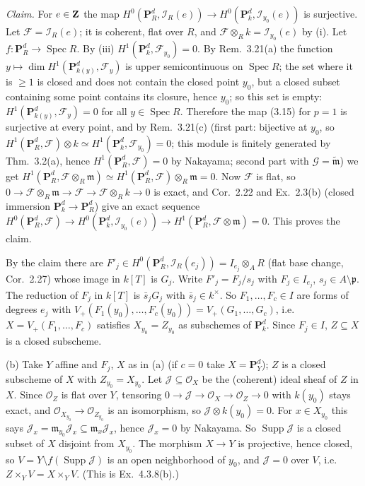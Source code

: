 \documentclass[11pt]{article}
\begin{document}
\emph{Claim.} For $e\in\mathbf Z$ the map $H^0(\mathbf P^d_R,\mathcal I_R(e))\to H^0(\mathbf P^d_k,\mathcal I_{y_0}(e))$ is surjective.
Let $\mathcal F=\mathcal I_R(e)$; it is coherent, flat over $R$, and $\mathcal F\otimes_Rk=\mathcal I_{y_0}(e)$ by (i). Let $f:\mathbf P^d_R\to\operatorname{Spec}R$. By (iii) $H^1(\mathbf P^d_k,\mathcal F_{y_0})=0$. By Rem.~3.21(a) the function $y\mapsto\dim H^1(\mathbf P^d_{k(y)},\mathcal F_y)$ is upper semicontinuous on $\operatorname{Spec}R$; the set where it is $\ge1$ is closed and does not contain the closed point $y_0$, but a closed subset containing some point contains its closure, hence $y_0$; so this set is empty: $H^1(\mathbf P^d_{k(y)},\mathcal F_y)=0$ for all $y\in\operatorname{Spec}R$. Therefore the map (3.15) for $p=1$ is surjective at every point, and by Rem.~3.21(c) (first part: bijective at $y_0$, so $H^1(\mathbf P^d_R,\mathcal F)\otimes k\simeq H^1(\mathbf P^d_k,\mathcal F_{y_0})=0$; this module is finitely generated by Thm.~3.2(a), hence $H^1(\mathbf P^d_R,\mathcal F)=0$ by Nakayama; second part with $\mathcal G=\widetilde{\mathfrak m}$) we get $H^1(\mathbf P^d_R,\mathcal F\otimes_R\mathfrak m)\simeq H^1(\mathbf P^d_R,\mathcal F)\otimes_R\mathfrak m=0$. Now $\mathcal F$ is flat, so $0\to\mathcal F\otimes_R\mathfrak m\to\mathcal F\to\mathcal F\otimes_Rk\to0$ is exact, and Cor.~2.22 and Ex.~2.3(b) (closed immersion $\mathbf P^d_k\to\mathbf P^d_R$) give an exact sequence $H^0(\mathbf P^d_R,\mathcal F)\to H^0(\mathbf P^d_k,\mathcal I_{y_0}(e))\to H^1(\mathbf P^d_R,\mathcal F\otimes\mathfrak m)=0$. This proves the claim.

By the claim there are $F'_j\in H^0(\mathbf P^d_R,\mathcal I_R(e_j))=I_{e_j}\otimes_AR$ (flat base change, Cor.~2.27) whose image in $k[T]$ is $G_j$. Write $F'_j=F_j/s_j$ with $F_j\in I_{e_j}$, $s_j\in A\setminus\mathfrak p$. The reduction of $F_j$ in $k[T]$ is $\bar s_jG_j$ with $\bar s_j\in k^\times$. So $F_1,\dots,F_c\in I$ are forms of degrees $e_j$ with $V_+(F_1(y_0),\dots,F_c(y_0))=V_+(G_1,\dots,G_c)$, i.e. $X=V_+(F_1,\dots,F_c)$ satisfies $X_{y_0}=Z_{y_0}$ as subschemes of $\mathbf P^d_{k}$. Since $F_j\in I$, $Z\subseteq X$ is a closed subscheme.

(b) Take $Y$ affine and $F_j$, $X$ as in (a) (if $c=0$ take $X=\mathbf P^d_Y$); $Z$ is a closed subscheme of $X$ with $Z_{y_0}=X_{y_0}$. Let $\mathcal J\subseteq\mathcal O_X$ be the (coherent) ideal sheaf of $Z$ in $X$. Since $\mathcal O_Z$ is flat over $Y$, tensoring $0\to\mathcal J\to\mathcal O_X\to\mathcal O_Z\to0$ with $k(y_0)$ stays exact, and $\mathcal O_{X_{y_0}}\to\mathcal O_{Z_{y_0}}$ is an isomorphism, so $\mathcal J\otimes k(y_0)=0$. For $x\in X_{y_0}$ this says $\mathcal J_x=\mathfrak m_{y_0}\mathcal J_x\subseteq\mathfrak m_x\mathcal J_x$, hence $\mathcal J_x=0$ by Nakayama. So $\operatorname{Supp}\mathcal J$ is a closed subset of $X$ disjoint from $X_{y_0}$. The morphism $X\to Y$ is projective, hence closed, so $V=Y\setminus f(\operatorname{Supp}\mathcal J)$ is an open neighborhood of $y_0$, and $\mathcal J=0$ over $V$, i.e. $Z\times_YV=X\times_YV$. (This is Ex.~4.3.8(b).)
\end{document}
